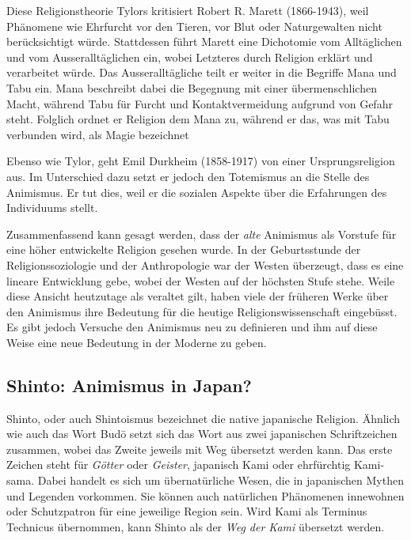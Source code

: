 Diese Religionstheorie Tylors kritisiert Robert R. Marett (1866-1943), weil Phänomene wie Ehrfurcht vor den Tieren, vor Blut oder Naturgewalten nicht berücksichtigt würde. Stattdessen führt Marett eine Dichotomie vom Alltäglichen und vom Ausseralltäglichen ein, wobei Letzteres durch Religion erklärt und verarbeitet würde. Das Ausseralltägliche teilt er weiter in die Begriffe Mana und Tabu ein. Mana beschreibt dabei die Begegnung mit einer übermenschlichen Macht, während Tabu für Furcht und Kontaktvermeidung aufgrund von Gefahr steht. Folglich ordnet er Religion dem Mana zu, während er das, was mit Tabu verbunden wird, als Magie bezeichnet 

Ebenso wie Tylor, geht Emil Durkheim (1858-1917) von einer Ursprungsreligion aus. Im Unterschied dazu setzt er jedoch den Totemismus an die Stelle des Animismus. Er tut dies, weil er die sozialen Aspekte über die Erfahrungen des Individuums stellt.

Zusammenfassend kann gesagt werden, dass der \emph{alte} Animismus als Vorstufe für eine höher entwickelte Religion gesehen wurde. In der Geburtsstunde der Religionssoziologie und der Anthropologie war der Westen überzeugt, dass es eine lineare Entwicklung gebe, wobei der Westen auf der höchsten Stufe stehe. Weile diese Ansicht heutzutage als veraltet gilt, haben viele der früheren Werke über den Animismus ihre Bedeutung für die heutige Religionswissenschaft eingebüsst. Es gibt jedoch Versuche den Animismus neu zu definieren und ihm auf diese Weise eine neue Bedeutung in der Moderne zu geben. 

\subsection{Shinto: Animismus in Japan?}
Shinto, oder auch Shintoismus bezeichnet die native japanische Religion. Ähnlich wie auch das Wort Bud\={o} setzt sich das Wort aus zwei japanischen Schriftzeichen zusammen, wobei das Zweite jeweils mit Weg übersetzt werden kann. Das erste Zeichen steht für \emph{Götter} oder \emph{Geister}, japanisch Kami oder ehrfürchtig Kami-sama. Dabei handelt es sich um übernatürliche Wesen, die in japanischen Mythen und Legenden vorkommen. Sie können auch natürlichen Phänomenen innewohnen oder Schutzpatron für eine jeweilige Region sein. Wird Kami als Terminus Technicus übernommen, kann Shinto als der \emph{Weg der Kami} übersetzt werden.

